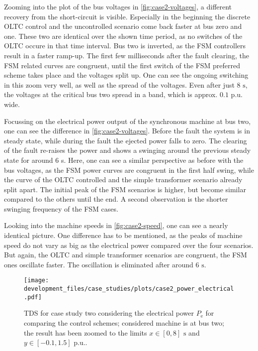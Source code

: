 Zooming into the plot of the bus voltages in \autoref{fig:case2-voltages}, a different recovery from the short-circuit is visible.
Especially in the beginning the discrete \acs{OLTC} control and the uncontrolled scenario come back faster at bus zero and one.
These two are identical over the shown time period, as no switches of the \acs{OLTC} occure in that time interval.
Bus two is inverted, as the \acs{FSM} controllers result in a faster ramp-up.
The first few milliseconds after the fault clearing, the \acs{FSM} related curves are congruent, until the first switch of the \acs{FSM} preferred scheme takes place and the voltages split up.
One can see the ongoing switching in this zoom very well, as well as the spread of the voltages.
Even after just $8\text{ s}$, the voltages at the critical bus two spread in a band, which is approx. $0.1\text{ p.u.}$ wide.

Focussing on the electrical power output of the synchronous machine at bus two, one can see the difference in \autoref{fig:case2-voltages}.
Before the fault the system is in steady state, while during the fault the ejected power falls to zero.
The clearing of the fault re-raises the power and shows a swinging around the previous steady state for around $6$ s.
Here, one can see a similar perspective as before with the bus voltages, as the \acs{FSM} power curves are congruent in the first half swing, while the curve of the \acs{OLTC} controlled and the simple transformer scenario already split apart.
The initial peak of the \acs{FSM} scenarios is higher, but become similar compared to the others until the end.
A second observation is the shorter swinging frequency of the \acs{FSM} cases.

Looking into the machine speeds in \autoref{fig:case2-speed}, one can see a nearly identical picture.
One difference has to be mentioned, as the peaks of machine speed do not vary as big as the electrical power compared over the four scenarios.
But again, the \acs{OLTC} and simple transformer scenarios are congruent, the \acs{FSM} ones oscillate faster.
The oscillation is eliminated after around $6\text{ s}$.

\begin{figure}[htbp!]
    \centering
    \texttt{[image: development\_files/case\_studies/plots/case2\_power\_electrical.pdf]}
    \caption[\acs{TDS} for case study two considering the electrical power]{\acs{TDS} for case study two considering the electrical power $P_\mathrm{e}$ for comparing the control schemes; considered machine is at bus two; the result has been zoomed to the limits $x \in [0,8]\text{ s}$ and $y \in [-0.1,1.5]\text{ p.u.}$.}
    \label{fig:case2-power}
\end{figure}

